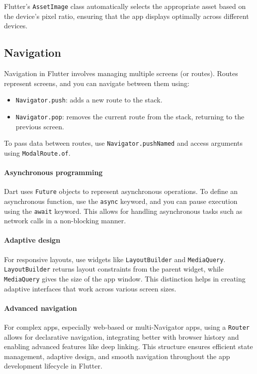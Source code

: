 Flutter's \texttt{AssetImage} class automatically selects the appropriate asset based on the device's pixel ratio, ensuring that the app displays optimally across different devices.

\subsection{Navigation}
Navigation in Flutter involves managing multiple screens (or routes). 
Routes represent screens, and you can navigate between them using:
\begin{itemize}
    \item \texttt{Navigator.push}: adds a new route to the stack.
    \item \texttt{Navigator.pop}: removes the current route from the stack, returning to the previous screen.
\end{itemize}
To pass data between routes, use \texttt{Navigator.pushNamed} and access arguments using \texttt{ModalRoute.of}.

\paragraph*{Asynchronous programming}
Dart uses \texttt{Future} objects to represent asynchronous operations. 
To define an asynchronous function, use the \texttt{async} keyword, and you can pause execution using the \texttt{await} keyword. 
This allows for handling asynchronous tasks such as network calls in a non-blocking manner.

\paragraph*{Adaptive design}
For responsive layouts, use widgets like \texttt{LayoutBuilder} and \texttt{MediaQuery}. 
\texttt{LayoutBuilder} returns layout constraints from the parent widget, while \texttt{MediaQuery} gives the size of the app window. 
This distinction helps in creating adaptive interfaces that work across various screen sizes.

\paragraph*{Advanced navigation}
For complex apps, especially web-based or multi-Navigator apps, using a \texttt{Router} allows for declarative navigation, integrating better with browser history and enabling advanced features like deep linking.
This structure ensures efficient state management, adaptive design, and smooth navigation throughout the app development lifecycle in Flutter.